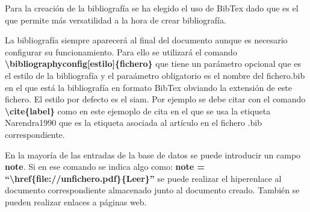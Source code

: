 Para la creación de la bibliografía se ha elegido el uso de BibTex dado que es el que permite más versatilidad a la hora de crear bibliografía.

La bibliografía siempre aparecerá al final del documento aunque es necesario configurar su funcionamiento. Para ello se utilizará el comando \textbf{\textbackslash bibliographyconfig[estilo]\{fichero\}} que tiene un parámetro opcional que es el estilo de la bibliografía y el paraámetro obligatorio es el nombre del fichero.bib en el que está la bibliografía en formato BibTex obviando la extensión de este fichero. El estilo por defecto es el siam. Por ejemplo se debe citar con el comando \textbf{\textbackslash cite\{label\}} como en este ejemoplo de cita \cite{Narendra1990} en el que se usa la etiqueta Narendra1990 que es la etiqueta asociada al artículo en el fichero .bib correspondiente.

En la mayoría de las entradas de la base de datos se puede introducir un campo \textbf{note}. Si en ese comando se indica algo como:
\textbf{note = ``{\textbackslash}href\{file://unfichero.pdf\}\{Leer\}''}
se puede realizar el hiperenlace al documento correspondiente almacenado junto al documento creado. También se pueden realizar enlaces a páginas web\cite{Zurek:1993}.
